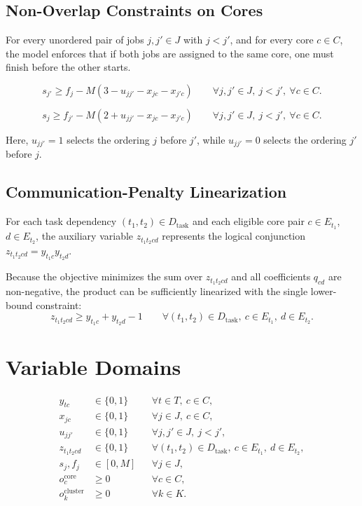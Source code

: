 \documentclass[11pt,a4paper]{article}
\begin{document}
\subsection{Non-Overlap Constraints on Cores}

For every unordered pair of jobs $j,j' \in J$ with $j<j'$, and for every core $c \in C$, the model enforces that if both jobs are assigned to the same core, one must finish before the other starts.

\begin{equation}
s_{j'}
\geq
f_j
-
M\left(3 - u_{jj'} - x_{jc} - x_{j'c}\right)
\qquad
\forall j,j' \in J,\ j<j',\ \forall c \in C.
\end{equation}

\begin{equation}
s_j
\geq
f_{j'}
-
M\left(2 + u_{jj'} - x_{jc} - x_{j'c}\right)
\qquad
\forall j,j' \in J,\ j<j',\ \forall c \in C.
\end{equation}

Here, $u_{jj'}=1$ selects the ordering $j$ before $j'$, while $u_{jj'}=0$ selects the ordering $j'$ before $j$.

\subsection{Communication-Penalty Linearization}

For each task dependency $(t_1,t_2)\in D_{\mathrm{task}}$ and each eligible core pair $c\in E_{t_1}$, $d\in E_{t_2}$, the auxiliary variable $z_{t_1 t_2 cd}$ represents the logical conjunction $z_{t_1 t_2 cd} = y_{t_1 c} y_{t_2 d}$.

Because the objective minimizes the sum over $z_{t_1 t_2 cd}$ and all coefficients $q_{cd}$ are non-negative, the product can be sufficiently linearized with the single lower-bound constraint:
\begin{equation}
z_{t_1 t_2 cd} \geq y_{t_1 c} + y_{t_2 d} - 1
\qquad
\forall (t_1,t_2)\in D_{\mathrm{task}},\ c\in E_{t_1},\ d\in E_{t_2}.
\end{equation}

\section{Variable Domains}

\begin{align*}
y_{tc} &\in \{0,1\}
&& \forall t \in T,\ c \in C,\\
x_{jc} &\in \{0,1\}
&& \forall j \in J,\ c \in C,\\
u_{jj'} &\in \{0,1\}
&& \forall j, j' \in J,\ j<j',\\
z_{t_1 t_2 cd} &\in \{0,1\}
&& \forall (t_1,t_2)\in D_{\mathrm{task}},\ c\in E_{t_1},\ d\in E_{t_2},\\
s_j, f_j &\in [0,M]
&& \forall j \in J,\\
o_c^{\mathrm{core}} &\geq 0
&& \forall c \in C,\\
o_k^{\mathrm{cluster}} &\geq 0
&& \forall k \in K.
\end{align*}
\end{document}
